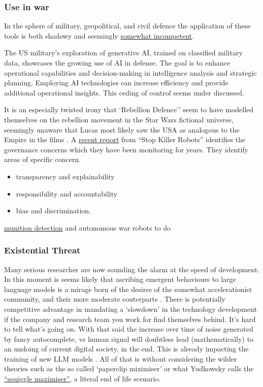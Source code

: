 \subsubsection{Use in war}
In the sphere of military, geopolitical, and civil defence the application of these tools is both shadowy and seemingly \href{https://www.vox.com/recode/23507236/inside-disruption-rebellion-defense-washington-connected-military-tech-startup}{somewhat incompetent}. \par
The US military's exploration of generative AI, trained on classified military data, showcases the growing use of AI in defense. The goal is to enhance operational capabilities and decision-making in intelligence analysis and strategic planning. Employing AI technologies can increase efficiency and provide additional operational insights. This ceding of control seems under discussed.\par

It is an especially twisted irony that `Rebellion Defence'' seem to have modelled themselves on the rebellion movement in the Star Wars fictional universe, seemingly unaware that Lucas most likely saw the USA as analogous to the Empire in the films \cite{immerwahr202221}. A \href{https://www.stopkillerrobots.org/wp-content/uploads/2022/10/ADR-Artificial-intelligence-and-automated-decisions-Single-View.pdf}{recent report} from ``Stop Killer Robots'' identifies the governance concerns which they have been monitoring for years. They identify areas of specific concern.
\begin{itemize}
\item transparency and explainability \item responsibility and  accountability
\item bias and discrimination.
\end{itemize}
\href{https://vframe.io/9n235/}{munition detection}  and autonomous war robots to do
\subsubsection{Existential Threat}
Many serious researcher are now sounding the alarm at the speed of development. In this moment is seems likely that ascribing emergent behaviours to large language models is a mirage born of the desires of the somewhat accelerationist community, and their more moderate couterparts \cite{schaeffer2023emergent}. There is potentially competitive advantage in mandating a `slowdown' in the technology development if the company and research team you work for find themselves behind. It's hard to tell what's going on. With that said the increase over time of noise generated by fancy autocomplete, vs human signal will doubtless lead (mathematically) to an undoing of current digital society, in the end. This is already impacting the training of new LLM models \cite{shumailov2023curse}. All of that is without considering the wilder theories such as the so called `paperclip miximiser' \cite{bostrom2003ethical}
or what Yudkowsky calls the \href{https://www.lesswrong.com/tag/squiggle-maximizer-formerly-paperclip-maximizer}{``squiggle maximiser''}, a literal end of life scenario.

